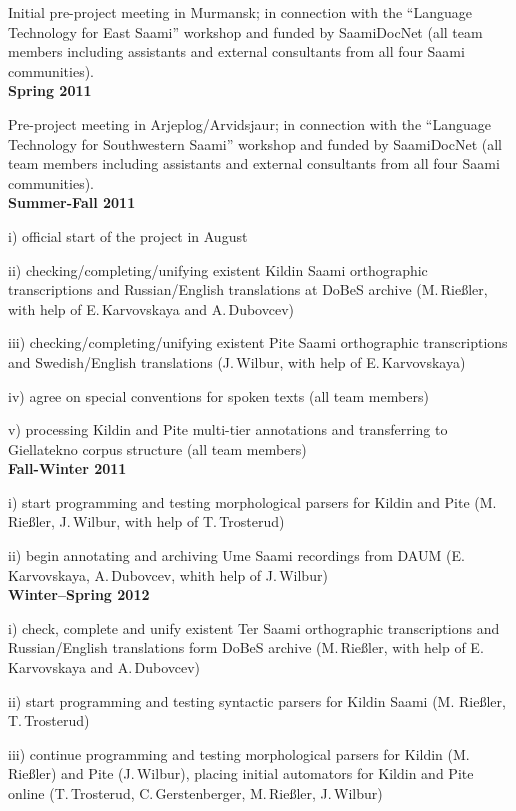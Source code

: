 \documentclass[a4paper,12pt]{article}
\begin{document}
{{\begin{flushleft}
Initial pre-project meeting in Murmansk; in connection with the “Language Technology for East Saami” workshop and funded by SaamiDocNet (all team members including assistants and external consultants from all four Saami communities).\\

\noindent \textbf{Spring 2011}

Pre-project meeting in Arjeplog/Arvidsjaur; in connection with the “Language Technology for Southwestern Saami” workshop and funded by Saa\-miDocNet (all team members including assistants and external consultants from all four Saami communities).\\

\noindent \textbf{Summer-Fall 2011}

i) official start of the project in August

ii) checking/completing/unifying existent Kildin Saami orthographic transcriptions and Russian/English translations at DoBeS archive (M.\,Rießler, with help of E.\,Karvovskaya and A.\,Dubovcev)

iii) checking/completing/unifying existent Pite Saami orthographic transcriptions and Swedish/English translations (J.\,Wilbur, with help of E.\,Kar\-vovs\-kaya)

iv) agree on special conventions for spoken texts (all team members)

v) processing Kildin and Pite multi-tier annotations and transferring to Giellatekno corpus structure (all team members)\\

\noindent \textbf{Fall-Winter 2011}

i) start programming and testing morphological parsers for Kildin and Pite (M.\,Rieß\-ler, J.\,Wilbur, with help of T.\,Trosterud)

ii) begin annotating and archiving Ume Saami recordings from DAUM (E.\,Karvovskaya, A.\,Dubovcev, whith help of J.\,Wilbur)\\

\noindent \textbf{Winter–Spring 2012}

i) check, complete and unify existent Ter Saami orthographic transcriptions and Russian/English translations form DoBeS archive (M.\,Rießler, with help of E.\,Karvovskaya and A.\,Dubovcev)

ii) start programming and testing syntactic parsers for Kildin Saami (M. Rießler, T.\,Trosterud)

iii) continue programming and testing morphological parsers for Kildin (M.\,Rießler) and Pite (J.\,Wilbur), placing initial automators for Kildin and Pite online (T.\,Trosterud, C.\,Gerstenberger, M.\,Rießler, J.\,Wilbur)


\end{flushleft}}}
\end{document}
